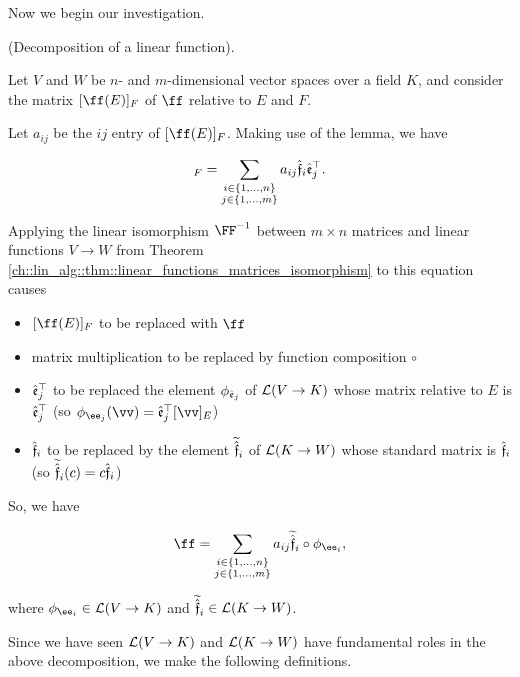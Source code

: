 Now we begin our investigation.

\begin{deriv}
    (Decomposition of a linear function).

    Let $V$ and $W$ be $n$- and $m$-dimensional vector spaces over a field $K$, and consider the matrix $[\ff(E)]_F$ of $\ff$ relative to $E$ and $F$.
    
    Let $a_{ij}$ be the $ij$ entry of $[\ff(E)]_F$. Making use of the lemma, we have

    \begin{align*}
        [\ff(E)]_F = \sum_{\substack{i \in \{1, ..., n\} \\ j \in \{1, ..., m\}}} a_{ij} \sff_i \see_j^\top.
    \end{align*}

    Applying the linear isomorphism $\FF^{-1}$ between $m \times n$ matrices and linear functions $V \rightarrow W$ from Theorem \ref{ch::lin_alg::thm::linear_functions_matrices_isomorphism} to this equation causes  \begin{itemize}
        \item $[\ff(E)]_F$ to be replaced with $\ff$
        \item matrix multiplication to be replaced by function composition $\circ$
        \item $\hat{\mathfrak{e}}_j^\top$ to be replaced the element $\phi_{\hat{\mathfrak{e}}_j}$ of $\mathcal{L}(V \rightarrow K)$ whose matrix relative to $E$ is $\hat{\mathfrak{e}}_j^\top$ (so $\phi_{\ee_j}(\vv) = \see_j^\top [\vv]_E$)
        \item $\hat{\mathfrak{f}}_i$ to be replaced by the element $\widetilde{\hat{\mathfrak{f}}}_i$ of $\mathcal{L}(K \rightarrow W)$ whose standard matrix is $\hat{\mathfrak{f}}_i$ (so $\widetilde{\hat{\mathfrak{f}}}_i(c) = c\hat{\mathfrak{f}}_i$)
    \end{itemize}

    So, we have

    \begin{align*}
        \ff = \sum_{\substack{i \in \{1, ..., n\} \\ j \in \{1, ..., m\}}} a_{ij} \tsff_i \circ \phi_{\ee_i},
    \end{align*}

    where $\phi_{\ee_i} \in \LLLL(V \rightarrow K)$ and $\widetilde{\hat{\mathfrak{f}}}_i \in \mathcal{L}(K \rightarrow W)$.
\end{deriv}

\newpage

Since we have seen $\mathcal{L}(V \rightarrow K)$ and $\mathcal{L}(K \rightarrow W)$ have fundamental roles in the above decomposition, we make the following definitions.

